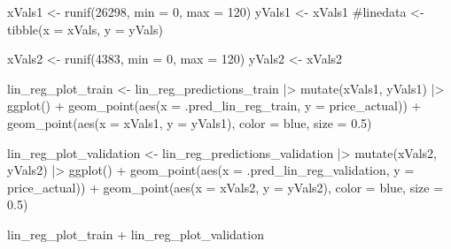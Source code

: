 \documentclass[
]{article}
\newenvironment{Shaded}{\begin{snugshade}}{\end{snugshade}}
\newcommand{\AttributeTok}[1]{\textcolor[rgb]{0.40,0.45,0.13}{#1}}
\newcommand{\CommentTok}[1]{\textcolor[rgb]{0.37,0.37,0.37}{#1}}
\newcommand{\DecValTok}[1]{\textcolor[rgb]{0.68,0.00,0.00}{#1}}
\newcommand{\FloatTok}[1]{\textcolor[rgb]{0.68,0.00,0.00}{#1}}
\newcommand{\FunctionTok}[1]{\textcolor[rgb]{0.28,0.35,0.67}{#1}}
\newcommand{\NormalTok}[1]{\textcolor[rgb]{0.00,0.23,0.31}{#1}}
\newcommand{\OtherTok}[1]{\textcolor[rgb]{0.00,0.23,0.31}{#1}}
\newcommand{\SpecialCharTok}[1]{\textcolor[rgb]{0.37,0.37,0.37}{#1}}
\newcommand{\StringTok}[1]{\textcolor[rgb]{0.13,0.47,0.30}{#1}}
\begin{document}
\begin{Shaded}
\begin{Highlighting}[]
\NormalTok{xVals1 }\OtherTok{\textless{}{-}} \FunctionTok{runif}\NormalTok{(}\DecValTok{26298}\NormalTok{, }\AttributeTok{min =} \DecValTok{0}\NormalTok{, }\AttributeTok{max =} \DecValTok{120}\NormalTok{)}
\NormalTok{yVals1 }\OtherTok{\textless{}{-}}\NormalTok{ xVals1}
\CommentTok{\#linedata \textless{}{-} tibble(x = xVals, y = yVals)}

\NormalTok{xVals2 }\OtherTok{\textless{}{-}} \FunctionTok{runif}\NormalTok{(}\DecValTok{4383}\NormalTok{, }\AttributeTok{min =} \DecValTok{0}\NormalTok{, }\AttributeTok{max =} \DecValTok{120}\NormalTok{)}
\NormalTok{yVals2 }\OtherTok{\textless{}{-}}\NormalTok{ xVals2}

\NormalTok{lin\_reg\_plot\_train }\OtherTok{\textless{}{-}}\NormalTok{ lin\_reg\_predictions\_train }\SpecialCharTok{|\textgreater{}}
  \FunctionTok{mutate}\NormalTok{(xVals1, yVals1) }\SpecialCharTok{|\textgreater{}}
  \FunctionTok{ggplot}\NormalTok{() }\SpecialCharTok{+}
  \FunctionTok{geom\_point}\NormalTok{(}\FunctionTok{aes}\NormalTok{(}\AttributeTok{x =}\NormalTok{ .pred\_lin\_reg\_train, }\AttributeTok{y =}\NormalTok{ price\_actual)) }\SpecialCharTok{+}
  \FunctionTok{geom\_point}\NormalTok{(}\FunctionTok{aes}\NormalTok{(}\AttributeTok{x =}\NormalTok{ xVals1, }\AttributeTok{y =}\NormalTok{ yVals1), }\AttributeTok{color =} \StringTok{\textquotesingle{}blue\textquotesingle{}}\NormalTok{, }\AttributeTok{size =} \FloatTok{0.5}\NormalTok{)}

\NormalTok{lin\_reg\_plot\_validation }\OtherTok{\textless{}{-}}\NormalTok{ lin\_reg\_predictions\_validation }\SpecialCharTok{|\textgreater{}}
  \FunctionTok{mutate}\NormalTok{(xVals2, yVals2) }\SpecialCharTok{|\textgreater{}}
  \FunctionTok{ggplot}\NormalTok{() }\SpecialCharTok{+}
  \FunctionTok{geom\_point}\NormalTok{(}\FunctionTok{aes}\NormalTok{(}\AttributeTok{x =}\NormalTok{ .pred\_lin\_reg\_validation, }\AttributeTok{y =}\NormalTok{ price\_actual)) }\SpecialCharTok{+}
  \FunctionTok{geom\_point}\NormalTok{(}\FunctionTok{aes}\NormalTok{(}\AttributeTok{x =}\NormalTok{ xVals2, }\AttributeTok{y =}\NormalTok{ yVals2), }\AttributeTok{color =} \StringTok{\textquotesingle{}blue\textquotesingle{}}\NormalTok{, }\AttributeTok{size =} \FloatTok{0.5}\NormalTok{)}

\NormalTok{lin\_reg\_plot\_train }\SpecialCharTok{+}\NormalTok{ lin\_reg\_plot\_validation}
\end{Highlighting}
\end{Shaded}
\end{document}

